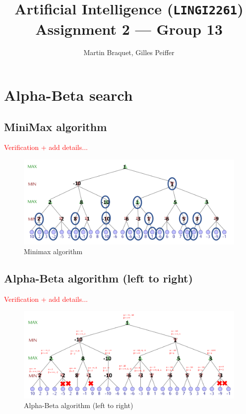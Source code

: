 \documentclass[en]{article}
\title{Artificial Intelligence (\texttt{LINGI2261}) \\ Assignment 2 --- Group 13}
\author{Martin Braquet, Gilles Peiffer}
\begin{document}
\maketitle

\section{Alpha-Beta search}

\subsection{MiniMax algorithm}

\textcolor{red}{Verification + add details...}

\begin{figure}[H]
 \centering
 \includegraphics[width=\textwidth]{MiniMax.png}
 \caption{Minimax algorithm}
 \label{fig:minimax}
\end{figure}


\subsection{Alpha-Beta algorithm (left to right)}

\textcolor{red}{Verification + add details...}

\begin{figure}[H]
 \centering
 \includegraphics[width=\textwidth]{Alphabeta.png}
 \caption{Alpha-Beta algorithm (left to right)}
 \label{fig:alphabeta}
\end{figure}
\end{document}
